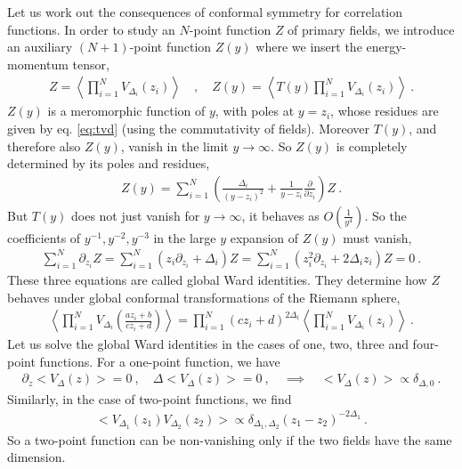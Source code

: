 \documentclass[12pt, a4paper]{article}
\theoremstyle{break}
\begin{document}
Let us work out the consequences of conformal symmetry for correlation functions.
In order to study an $N$-point function $Z$ of primary fields, we introduce an auxiliary $(N+1)$-point function $Z(y)$ where we insert the energy-momentum tensor,
\begin{align}
 Z = \left< \prod_{i=1}^N V_{\Delta_i}(z_i) \right> \quad , \quad Z(y) = \left< T(y) \prod_{i=1}^N V_{\Delta_i}(z_i) \right> \ .
\end{align}
$Z(y)$ is a meromorphic function of $y$, with poles at $y=z_i$, whose residues are given by eq. \eqref{eq:tvd} (using the commutativity of fields).
Moreover $T(y)$, and therefore also $Z(y)$, vanish in the limit $y\to \infty$. So $Z(y)$ is completely determined by its poles and residues,
\begin{align}
 Z(y) = \sum_{i=1}^N \left(\frac{\Delta_i}{(y-z_i)^2} +\frac{1}{y-z_i}\frac{\partial}{\partial z_i}\right) Z\ .
 \label{eq:zy}
\end{align}
But $T(y)$ does not just vanish for $y\to \infty$, it behaves as $O(\frac{1}{y^4})$.
So the coefficients of $y^{-1}, y^{-2}, y^{-3}$ in the large $y$ expansion of $Z(y)$ must vanish, 
\begin{align}
 \sum_{i=1}^N \partial_{z_i} Z = \sum_{i=1}^N \left(z_i \partial_{z_i} + \Delta_i\right) Z = \sum_{i=1}^N \left(z_i^2 \partial_{z_i} + 2\Delta_iz_i\right) Z = 0\ .
 \label{eq:gward}
\end{align}
These three equations are called global Ward identities. They determine how $Z$ behaves under global conformal transformations of the Riemann sphere,
\begin{align}
 \left< \prod_{i=1}^N  V_{\Delta_i}\left(\frac{az_i+b}{cz_i+d}\right) \right>
 = \prod_{i=1}^N (cz_i +d)^{2\Delta_i} \left< \prod_{i=1}^N V_{\Delta_i}(z_i) \right>\ .
 \label{eq:zgc}
\end{align}
Let us solve the global Ward identities in the cases of one, two, three and four-point functions. For a one-point function, we have 
\begin{align}
\partial_z \Big< V_\Delta(z)\Big> = 0 \ , \quad \Delta \Big< V_\Delta(z)\Big> = 0\ , \quad \implies \quad \Big< V_\Delta(z)\Big> \propto \delta_{\Delta, 0}\ .
\end{align}
Similarly, in the case of two-point functions, we find 
\begin{align}
 \Big< V_{\Delta_1}(z_1)V_{\Delta_2}(z_2) \Big> \propto \delta_{\Delta_1,\Delta_2} (z_1-z_2)^{-2\Delta_1} \ .
 \label{eq:2pt}
\end{align}
So a two-point function can be non-vanishing only if the two fields have the same dimension.
\end{document}
